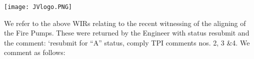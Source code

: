 \documentclass[a4paper,11pt,oneside]{article}
\begin{document}
\sffamily
\mbox{}
\texttt{[image: JVlogo.PNG]}


\Date 


\TO


\setlength{\parskip}{\baselineskip}


We refer to the above WIRs relating to the recent witnessing of the aligning of the Fire Pumps. These were returned by the Engineer with status resubmit and the comment: `resubmit for ``A'' status, comply TPI comments nos. 2, 3 \&4. We comment as follows:
\end{document}
